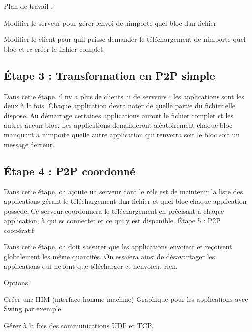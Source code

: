 Plan de travail \+:


\begin{DoxyItemize}
\item Modifier le serveur pour gérer l\textquotesingle{}envoi de n\textquotesingle{}importe quel bloc d\textquotesingle{}un fichier
\item Modifier le client pour qu\textquotesingle{}il puisse demander le téléchargement de n\textquotesingle{}importe quel bloc et re-\/créer le fichier complet.
\end{DoxyItemize}

\subsection*{Étape 3 \+: Transformation en P2P simple}

Dans cette étape, il n\textquotesingle{}y a plus de clients ni de serveurs ; les applications sont les deux à la fois. Chaque application devra noter de quelle partie du fichier elle dispose. Au démarrage certaines applications auront le fichier complet et les autres aucun bloc. Les applications demanderont aléatoirement chaque bloc manquant à n\textquotesingle{}importe quelle autre application qui renverra soit le bloc soit un message d\textquotesingle{}erreur.

\subsection*{Étape 4 \+: P2P coordonné}

Dans cette étape, on ajoute un serveur dont le rôle est de maintenir la liste des applications gérant le téléchargement d\textquotesingle{}un fichier et quel bloc chaque application possède. Ce serveur coordonnera le téléchargement en précisant à chaque application, à qui se connecter et ce qui y est disponible. Étape 5 \+: P2P coopératif

Dans cette étape, on doit s\textquotesingle{}assurer que les applications envoient et reçoivent globalement les même quantités. On essaiera ainsi de désavantager les applications qui ne font que télécharger et n\textquotesingle{}envoient rien.

Options \+:


\begin{DoxyItemize}
\item Créer une I\+HM (interface homme machine) Graphique pour les applications avec Swing par exemple.
\item Gérer à la fois des communications U\+DP et T\+CP. 
\end{DoxyItemize}